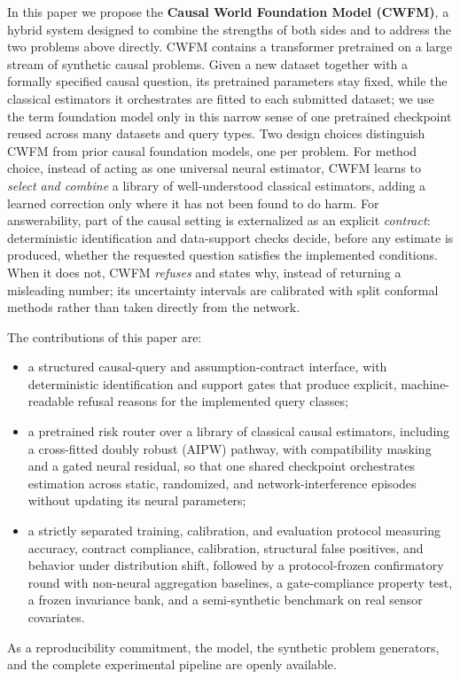 \documentclass[electronics,article,submit,oneauthor]{Definitions/mdpi}
\begin{document}
In this paper we propose the \textbf{Causal World Foundation Model (CWFM)}, a hybrid system designed to combine the strengths of both sides and to address the two problems above directly. CWFM contains a transformer pretrained on a large stream of synthetic causal problems. Given a new dataset together with a formally specified causal question, its pretrained parameters stay fixed, while the classical estimators it orchestrates are fitted to each submitted dataset; we use the term foundation model only in this narrow sense of one pretrained checkpoint reused across many datasets and query types. Two design choices distinguish CWFM from prior causal foundation models, one per problem. For method choice, instead of acting as one universal neural estimator, CWFM learns to \emph{select and combine} a library of well-understood classical estimators, adding a learned correction only where it has not been found to do harm. For answerability, part of the causal setting is externalized as an explicit \emph{contract}: deterministic identification and data-support checks decide, before any estimate is produced, whether the requested question satisfies the implemented conditions. When it does not, CWFM \emph{refuses} and states why, instead of returning a misleading number; its uncertainty intervals are calibrated with split conformal methods rather than taken directly from the network.

The contributions of this paper are:
\begin{itemize}
\item a structured causal-query and assumption-contract interface, with deterministic identification and support gates that produce explicit, machine-readable refusal reasons for the implemented query classes;
\item a pretrained risk router over a library of classical causal estimators, including a cross-fitted doubly robust (AIPW) pathway, with compatibility masking and a gated neural residual, so that one shared checkpoint orchestrates estimation across static, randomized, and network-interference episodes without updating its neural parameters;
\item a strictly separated training, calibration, and evaluation protocol measuring accuracy, contract compliance, calibration, structural false positives, and behavior under distribution shift, followed by a protocol-frozen confirmatory round with non-neural aggregation baselines, a gate-compliance property test, a frozen invariance bank, and a semi-synthetic benchmark on real sensor covariates.
\end{itemize}
As a reproducibility commitment, the model, the synthetic problem generators, and the complete experimental pipeline are openly available.
\end{document}
